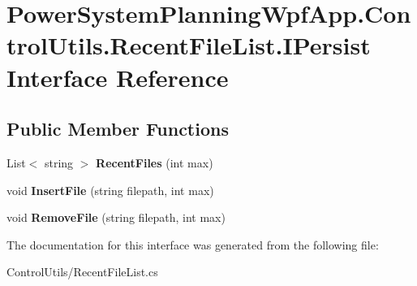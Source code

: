\hypertarget{interface_power_system_planning_wpf_app_1_1_control_utils_1_1_recent_file_list_1_1_i_persist}{}\section{Power\+System\+Planning\+Wpf\+App.\+Control\+Utils.\+Recent\+File\+List.\+I\+Persist Interface Reference}
\label{interface_power_system_planning_wpf_app_1_1_control_utils_1_1_recent_file_list_1_1_i_persist}
\subsection*{Public Member Functions}
\begin{DoxyCompactItemize}
\item 
List$<$ string $>$ {\bfseries Recent\+Files} (int max)\hypertarget{interface_power_system_planning_wpf_app_1_1_control_utils_1_1_recent_file_list_1_1_i_persist_aa4e2e273f3126ff7a68084d799349b5f}{}\label{interface_power_system_planning_wpf_app_1_1_control_utils_1_1_recent_file_list_1_1_i_persist_aa4e2e273f3126ff7a68084d799349b5f}

\item 
void {\bfseries Insert\+File} (string filepath, int max)\hypertarget{interface_power_system_planning_wpf_app_1_1_control_utils_1_1_recent_file_list_1_1_i_persist_aa1df07d04ebb48469eaeae7aca044705}{}\label{interface_power_system_planning_wpf_app_1_1_control_utils_1_1_recent_file_list_1_1_i_persist_aa1df07d04ebb48469eaeae7aca044705}

\item 
void {\bfseries Remove\+File} (string filepath, int max)\hypertarget{interface_power_system_planning_wpf_app_1_1_control_utils_1_1_recent_file_list_1_1_i_persist_a953120ee3ba2ac7e4496c5bf90260bde}{}\label{interface_power_system_planning_wpf_app_1_1_control_utils_1_1_recent_file_list_1_1_i_persist_a953120ee3ba2ac7e4496c5bf90260bde}

\end{DoxyCompactItemize}


The documentation for this interface was generated from the following file\+:\begin{DoxyCompactItemize}
\item 
Control\+Utils/Recent\+File\+List.\+cs\end{DoxyCompactItemize}
